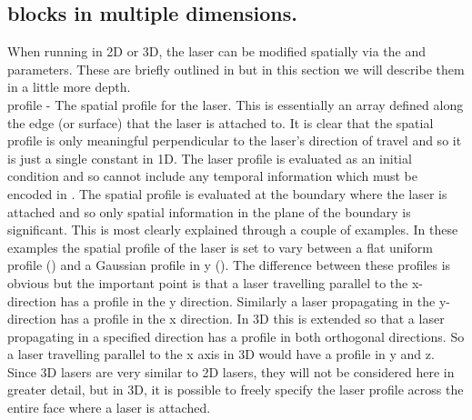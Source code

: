 \subsection{ blocks in multiple dimensions.}
\label{sec:multilaser}


When running {\EPOCH} in 2D or 3D, the laser can be modified spatially
via the  and  parameters. These
are briefly outlined in  but in this section we will describe
them in a little more depth.\\

{\emphtext profile} - The spatial profile for the laser. This is
essentially an array defined along the edge (or surface) that the laser is
attached to. It is clear that the spatial profile is only meaningful
perpendicular to the laser's direction of travel and so it is just a single
constant in 1D. The laser profile is evaluated as an initial condition
and so cannot include any temporal information which must be
encoded in .  The spatial profile is evaluated at the
boundary where the laser is attached and so only spatial information in the
plane of the boundary is significant. This is most clearly explained through a
couple of examples. In these examples the spatial profile of the laser is set
to vary between a flat uniform profile () and a
Gaussian profile in y (). The
difference between these profiles is obvious but the important point is that a
laser travelling parallel to the x-direction has a profile in the y
direction. Similarly a laser propagating in the y-direction has a profile in
the x direction. In 3D this is extended so that a laser propagating in a
specified direction has a profile in both orthogonal directions. So a laser
travelling parallel to the x axis in 3D would have a profile in y and z. Since
3D lasers are very similar to 2D lasers, they will not be considered here in
greater detail, but in 3D, it is possible to freely specify the laser profile
across the entire face where a laser is attached.\\


